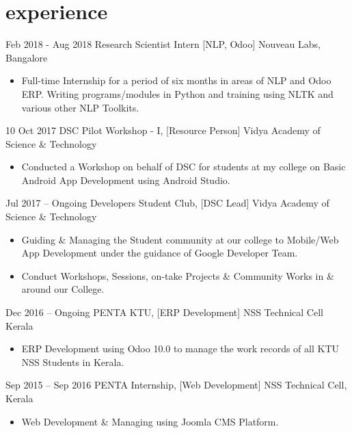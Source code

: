 \documentclass[]{friggeri-cv}
\begin{document}
\section{experience}
\begin{entrylist}
	\entry
	{Feb 2018 - Aug 2018}
	{Research Scientist Intern [NLP, Odoo]}
	{Nouveau Labs, Bangalore}
	{\vspace{-3mm}\begin{itemize}[leftmargin=10pt,itemsep=1pt]
		\item Full-time Internship for a period of six months in areas of NLP and Odoo ERP. Writing programs/modules in Python and training using NLTK and various other NLP Toolkits.
	\end{itemize}}
	\entry
	{10 Oct 2017}
	{DSC Pilot Workshop - I, [Resource Person]}
	{Vidya Academy of Science \& Technology}
	{\vspace{-3mm}\begin{itemize}[leftmargin=10pt,itemsep=1pt]
		\item Conducted a Workshop on behalf of DSC for students at my college on Basic Android App Development using Android Studio.
		\end{itemize}}
	\entry
	{Jul 2017 – Ongoing}
	{Developers Student Club, [DSC Lead]}
	{Vidya Academy of Science \& Technology}
	{\vspace{-3mm}\begin{itemize}[leftmargin=10pt,itemsep=1pt]
		\item Guiding \& Managing the Student community at our college to Mobile/Web App Development under the guidance of Google Developer Team.
		\item Conduct Workshops, Sessions, on-take Projects \& Community Works in \& around our College.
		\end{itemize}}
	\entry
	{Dec 2016 – Ongoing}
	{PENTA KTU, [ERP Development]}
	{NSS Technical Cell Kerala}
	{\vspace{-3mm}\begin{itemize}[leftmargin=10pt,itemsep=1pt]
		\item ERP Development using Odoo 10.0 to manage the work records of all KTU NSS Students in Kerala.
		\end{itemize}}
	\entry
	{Sep 2015 – Sep 2016}
	{PENTA Internship, [Web Development]}
	{NSS Technical Cell, Kerala}
	{\vspace{-3mm}\begin{itemize}[leftmargin=10pt,itemsep=1pt]
		\item Web Development \& Managing using Joomla CMS Platform.
		\end{itemize}}
\end{entrylist}
\end{document}
